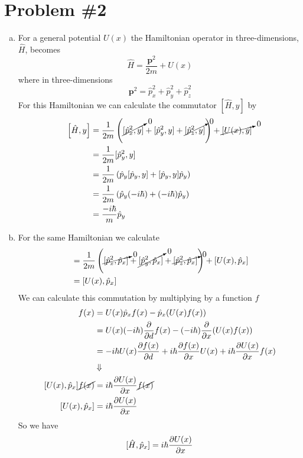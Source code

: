 \documentclass[11pt]{article}
\numberwithin{equation}{section}
\begin{document}
\section{Problem \#2}
\begin{enumerate}[(a)]
\item For a general potential $U(x)$ the Hamiltonian operator in three-dimensions, $\hat{H}$,
becomes
$$\hat{H} = \frac{\mathbf{p}^2}{2m}+U(x)$$
where in three-dimensions 
$$\mathbf{p}^2 = \hat{p}^2_x+\hat{p}^2_y+\hat{p}^2_z$$
For this Hamiltonian we can calculate the commutator $[\hat{H},y]$ by
\begin{align*}
\left[\hat{H},y\right] &= \frac{1}{2m}\left(\cancelto{0}{[\hat{p}^2_x,y]} + [\hat{p}^2_y,y] + \cancelto{0}{[\hat{p}^2_z,y]}\right)+\cancelto{0}{[U(x),y]}\\
&= \frac{1}{2m}[\hat{p}^2_y,y]\\
&= \frac{1}{2m}\left(\hat{p}_y[\hat{p}_y,y] +[\hat{p}_y,y]\hat{p}_y\right)\\
&= \frac{1}{2m}\left(\hat{p}_y(-i\hbar) + (-i\hbar)\hat{p}_y\right)\\
&= \frac{-i\hbar}{m}\hat{p}_y
\end{align*}

\item For the same Hamiltonian we calculate
\begin{align*}
[\hat{H},\hat{p}_x] &= \frac{1}{2m}\left(\cancelto{0}{[\hat{p}^2_x,\hat{p}_x]} + \cancelto{0}{[\hat{p}^2_y,\hat{p}_x]} + \cancelto{0}{[\hat{p}^2_z,\hat{p}_x]}\right)+[U(x),\hat{p}_x]\\
&= [U(x),\hat{p}_x]
\end{align*}
We can calculate this commutation by multiplying by a function $f$
\begin{align*}
[U(x),\hat{p}_x]f(x) &= U(x)\hat{p}_xf(x) - \hat{p}_x(U(x)f(x))\\
&= U(x)(-i\hbar)\partiald{}{d}f(x) - (-i\hbar)\partiald{}{x}(U(x)f(x))\\
&= -i\hbar U(x)\partiald{f(x)}{d} + i\hbar\partiald{f(x)}{x}U(x) +i\hbar\partiald{U(x)}{x}f(x)\\
&\Downarrow\\
[U(x),\hat{p}_x]\cancel{f(x)} &= i\hbar\partiald{U(x)}{x}\cancel{f(x)}\\
[U(x),\hat{p}_x] &= i\hbar\partiald{U(x)}{x}
\end{align*}
So we have
$$[\hat{H},\hat{p}_x] = i\hbar\frac{\partial{U(x)}}{\partial{x}}$$


\end{enumerate}
\end{document}
